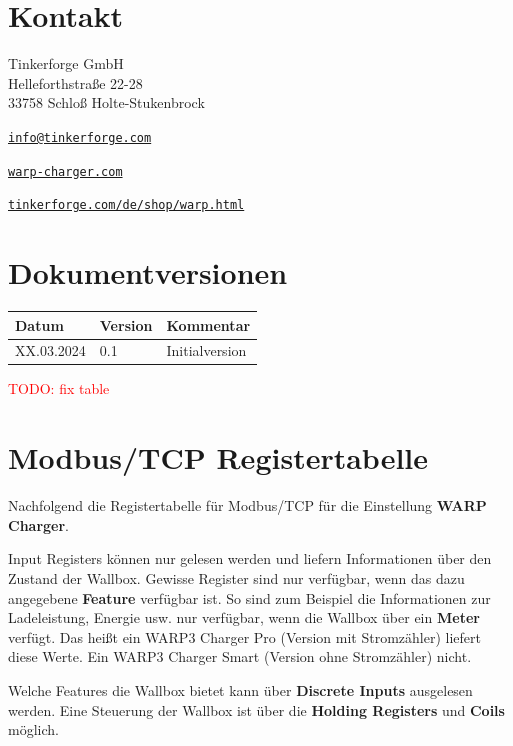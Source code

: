 \documentclass[a4paper,10pt]{article}
\newcommand\todo[1]{\textcolor{red}{\huge TODO: #1}}
\begin{document}
\begin{multicols*}{2}
    \newpage

    \section{Kontakt}
    Tinkerforge GmbH\\ Helleforthstraße 22-28\\ 33758 Schloß Holte-Stukenbrock
    \begin{description}[leftmargin=!,labelwidth=\widthof{\textbf{Website}}]
        \item[E-Mail] \href{mailto:info@tinkerforge.com}{\texttt{info@tinkerforge.com}}
        \item[Website] \href{https://warp-charger.com}{\texttt{warp-charger.com}}
        \item[Telefon] 
        \item[Shop] \href{https://tinkerforge.com/de/shop/warp.html}{\texttt{tinkerforge.com/de/shop/warp.html}}
    \end{description}

    \section{Dokumentversionen}
    \begin{tabular}{lll}
        \toprule
        Datum      & Version\hspace{-0.2pt} & Kommentar        \\
        \midrule
        XX.03.2024 & 0.1     & Initialversion                  \\
        \bottomrule
    \end{tabular}
	\todo{fix table}
    \vfill
    \null

    \columnbreak
\appendix

\section{Modbus/TCP Registertabelle}
\label{modbus_tcp_registertabelle}
Nachfolgend die Registertabelle für Modbus/TCP für die Einstellung \textbf{WARP
Charger}.

Input Registers können nur gelesen werden und liefern Informationen über den
Zustand der Wallbox. Gewisse Register sind nur verfügbar, wenn das dazu
angegebene \textbf{Feature} verfügbar ist. So sind zum Beispiel die
Informationen zur Ladeleistung, Energie usw. nur verfügbar, wenn die Wallbox
über ein \textbf{Meter} verfügt. Das heißt ein WARP3 Charger Pro (Version mit
Stromzähler) liefert diese Werte. Ein WARP3 Charger Smart (Version ohne
Stromzähler) nicht.

Welche Features die Wallbox bietet kann über \textbf{Discrete Inputs} ausgelesen
werden. Eine Steuerung der Wallbox ist über die \textbf{Holding Registers} und \textbf{Coils}
möglich.
\end{multicols*}
\end{document}
